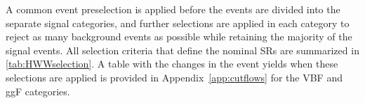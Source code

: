 



A common event preselection is applied before the events are divided into the separate signal categories, and further selections are applied in each category to reject as many background events as possible while retaining the majority of the signal events.
All selection criteria that define the nominal SRs are summarized in \cref{tab:HWWselection}. 
A table with the changes in the event yields when these selections are applied is provided in Appendix~\ref{app:cutflows} for the VBF and ggF \TwoJet categories. 

\FloatBarrier
\begin{table}[t]
    \centering
    \caption[Event selection criteria used to define the nominal signal regions.]{
    Event selection criteria used to define the nominal signal regions in the \hww\ analysis. The definitions of the variables can be found in the text.
    \label{tab:HWWselection}
    }
    \resizebox{\textwidth}{!}{
    
    }
\end{table}

